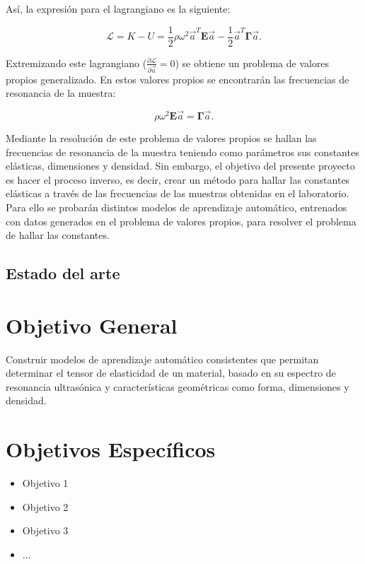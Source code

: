 \documentclass[12pt]{article}
\begin{document}
Así, la expresión para el lagrangiano es la siguiente: 

\begin{equation}
	\mathcal{L} = K - U = \frac{1}{2} \rho \omega^2 \vec{a}^{T}\bm{E}\vec{a} - \frac{1}{2} \vec{a}^{T}\bm{\Gamma}\vec{a}.
\end{equation}

Extremizando este lagrangiano ($\frac{\partial \mathcal{L}}{\partial \vec{a}} = 0$) se obtiene un problema de valores propios generalizado. En estos valores propios se encontrarán las frecuencias de resonancia de la muestra:

\begin{equation}
	\rho \omega^2 \bm{E} \vec{a} = \bm{\Gamma} \vec{a}.
	\label{eq:eigenvalue-problem}
\end{equation}

Mediante la resolución de este problema de valores propios se hallan las frecuencias de resonancia de la muestra teniendo como parámetros sus constantes elásticas, dimensiones y densidad. Sin embargo, el objetivo del presente proyecto es hacer el proceso inverso, es decir, crear un método para hallar las constantes elásticas a través de las frecuencias de las muestras obtenidas en el laboratorio. Para ello se probarán distintos modelos de aprendizaje automático, entrenados con datos generados en el problema de valores propios, para resolver el problema de hallar las constantes. 

\subsection{Estado del arte}

\section{Objetivo General}

Construir modelos de aprendizaje automático consistentes que permitan determinar el tensor de elasticidad de un material, basado en su espectro de resonancia ultrasónica y características geométricas como forma, dimensiones y densidad.
\section{Objetivos Específicos}


\begin{itemize}
	\item Objetivo 1
	\item Objetivo 2
	\item Objetivo 3
	\item ...
\end{itemize}
\end{document}
